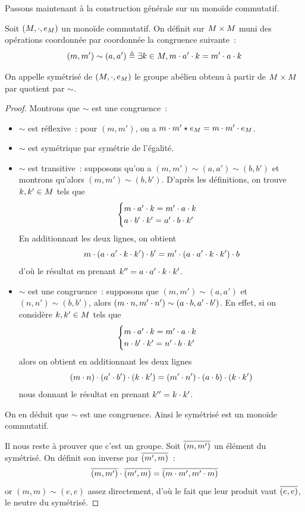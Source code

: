 \noindent
Passons maintenant à la construction générale sur un monoïde commutatif.

\begin{definition}
  Soit $(M,\mathbin{\cdot},e_{M})$ un monoïde commutatif. On définit sur
  $M\times M$ muni des opérations coordonnée par coordonnée la
  congruence suivante~:
  \[(m,m') \sim (a,a') \triangleq \exists k \in M,
  m \mathbin{\cdot} a' \mathbin{\cdot} k = m' \mathbin{\cdot} a \mathbin{\cdot} k\]

  On appelle symétrisé de $(M,\mathbin{\cdot},e_{M})$ le groupe abélien obtenu à
  partir de $M\times M$ par quotient par $\sim$.
\end{definition}

\begin{proof}
  Montrons que $\sim$ est une congruence~:
  \begin{itemize}
  \item $\sim$ est réflexive~: pour $(m,m')$, on a
    $m \mathbin{\cdot} m' \star e_{M} = m \mathbin{\cdot} m' \mathbin{\cdot} e_{M}$.
  \item $\sim$ est symétrique par symétrie de l'égalité.
  \item $\sim$ est transitive~: supposons qu'on a $(m,m')\sim (a,a')\sim(b,b')$
    et montrons qu'alors $(m,m')\sim (b,b')$. D'après les définitions, on trouve
    $k,k'\in M$ tels que
    \[\begin{cases}
    m \mathbin{\cdot} a' \mathbin{\cdot} k = m' \mathbin{\cdot} a \mathbin{\cdot} k\\
    a \mathbin{\cdot} b' \mathbin{\cdot} k' = a' \mathbin{\cdot} b \mathbin{\cdot} k'
    \end{cases}\]
    En \og additionnant\fg{} les deux lignes, on obtient
    \[m\mathbin{\cdot}(a\mathbin{\cdot} a'\mathbin{\cdot} k\mathbin{\cdot} k')\mathbin{\cdot} b'=m'\mathbin{\cdot}(a\mathbin{\cdot} a'\mathbin{\cdot} k\mathbin{\cdot} k')\mathbin{\cdot} b\]
    d'où le résultat en prenant $k'' = a \mathbin{\cdot} a' \mathbin{\cdot} k \mathbin{\cdot} k'$.
  \item $\sim$ est une congruence~: supposons que $(m,m')\sim(a,a')$ et
    $(n,n')\sim(b,b')$, alors
    $(m\mathbin{\cdot} n, m' \mathbin{\cdot} n') \sim(a\mathbin{\cdot} b,a'\mathbin{\cdot} b')$. En effet, si on
    considère $k,k'\in M$ tels que
    \[\begin{cases}
    m \mathbin{\cdot} a' \mathbin{\cdot} k = m' \mathbin{\cdot} a \mathbin{\cdot} k\\
    n \mathbin{\cdot} b' \mathbin{\cdot} k' = n' \mathbin{\cdot} b \mathbin{\cdot} k'
    \end{cases}\]
    alors on obtient en \og additionnant\fg{} les deux lignes
    \[(m \mathbin{\cdot} n) \mathbin{\cdot} (a' \mathbin{\cdot} b') \mathbin{\cdot} (k \mathbin{\cdot} k') =
    (m' \mathbin{\cdot} n') \mathbin{\cdot} (a \mathbin{\cdot} b) \mathbin{\cdot} (k \mathbin{\cdot} k')\]
    nous donnant le résultat en prenant $k'' = k \mathbin{\cdot} k'$.
  \end{itemize}
  On en déduit que $\sim$ est une congruence. Ainsi le symétrisé est un monoïde
  commutatif.

  Il nous reste à prouver que c'est un groupe. Soit $\overline{(m,m')}$ un
  élément du symétrisé. On définit son inverse par $\overline{(m',m)}$~:
  \[\overline{(m,m')}\mathbin{\cdot} \overline{(m',m)} =
  \overline{(m\mathbin{\cdot} m',m'\mathbin{\cdot} m)}\]
  or $(m,m)\sim (e,e)$ assez directement, d'où le fait que leur produit vaut
  $\overline{(e,e)}$, le neutre du symétrisé.
\end{proof}

